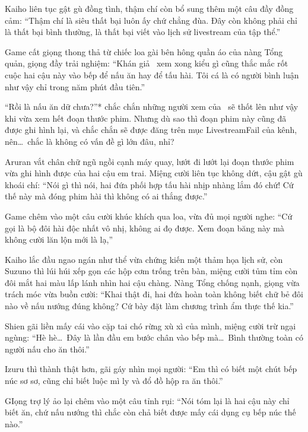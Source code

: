 \documentclass[../main.tex]{subfiles}
\begin{document}

Kaiho liên tục gật gù đồng tình, thậm chí còn bổ sung thêm một câu đầy đồng cảm: ``Thậm chí là siêu thất bại luôn ấy chứ chẳng đùa. Đây còn không phải chỉ là thất bại bình thường, là thất bại viết vào lịch sử livestream của tập thể.''

Game cất giọng thong thả từ chiếc loa gài bên hông quần áo của nàng Tổng quản, giọng đầy trải nghiệm: ``Khán giả \hls\ xem xong kiểu gì cũng thắc mắc rốt cuộc hai cậu này vào bếp để nấu ăn hay để tấu hài. Tôi cá là có người bình luận như vậy chỉ trong năm phút đầu tiên.''

``Rồi là nấu ăn dữ chưa?''* chắc chắn những người xem của \hls\ sẽ thốt lên như vậy khi vừa xem hết đoạn thước phim. Nhưng dù sao thì đoạn phim này cũng đã được ghi hình lại, và chắc chắn sẽ được đăng trên mục LivestreamFail của kênh, nên\dots\ chắc là không có vấn đề gì lớn đâu, nhỉ?

\omk

Aruran vắt chân chữ ngũ ngồi cạnh máy quay, lướt đi lướt lại đoạn thước phim vừa ghi hình được của hai cậu em trai. Miệng cười liên tục không dứt, cậu gật gù khoái chí: ``Nói gì thì nói, hai đứa phối hợp tấu hài nhịp nhàng lắm đó chứ! Cứ thế này mà đóng phim hài thì không có ai thắng được.''

Game chêm vào một câu cười khúc khích qua loa, vừa đủ mọi người nghe: ``Cứ gọi là bộ đôi hài độc nhất vô nhị, không ai đọ được. Xem đoạn băng này mà không cười lăn lộn mới là lạ,''

Kaiho lắc đầu ngao ngán như thể vừa chứng kiến một thảm họa lịch sử, còn Suzuno thì lúi húi xếp gọn các hộp cơm trống trên bàn, miệng cười tủm tỉm còn đôi mắt hai màu lấp lánh nhìn hai cậu chàng. Nàng Tổng chống nạnh, giọng vừa trách móc vừa buồn cười: ``Khai thật đi, hai đứa hoàn toàn không biết chữ bẻ đôi nào về nấu nướng đúng không? Cứ bày đặt làm chương trình ẩm thực thế kia.''

Shien gãi liền mấy cái vào cặp tai chó rừng xù xì của mình, miệng cười trừ ngại ngùng: ``Hè hè\dots\ Đây là lần đầu em bước chân vào bếp mà\dots\ Bình thường toàn có người nấu cho ăn thôi.''

Izuru thì thành thật hơn, gãi gáy nhìn mọi người: ``Em thì có biết một chút bếp núc sơ sơ, cũng chỉ biết luộc mì ly và đổ đồ hộp ra ăn thôi.''

GIọng trợ lý ảo lại chêm vào một câu tỉnh rụi: ``Nói tóm lại là hai cậu này chỉ biết ăn, chứ nấu nướng thì chắc còn chả biết được mấy cái dụng cụ bếp núc thế nào.''
\end{document}
